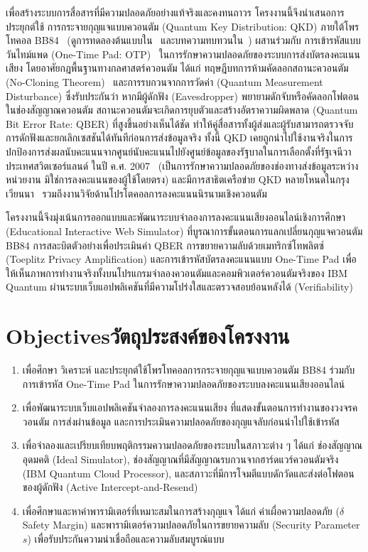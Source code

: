 เพื่อสร้างระบบการสื่อสารที่มีความปลอดภัยอย่างแท้จริงและคงทนถาวร โครงงานนี้จึงนำเสนอการประยุกต์ใช้ การกระจายกุญแจแบบควอนตัม (Quantum Key Distribution: QKD) ภายใต้โพรโทคอล BB84~\cite{bb84} (ดูการทดลองต้นแบบใน~\cite{bennett_1992_experimental} และบทความทบทวนใน~\cite{gisin_qkd_review, pirandola_advances_qkd}) ผสานร่วมกับ การเข้ารหัสแบบวันไทม์แพด (One-Time Pad: OTP)~\cite{vernam_cipher, shannon_secure} ในการรักษาความปลอดภัยของระบบการส่งบัตรลงคะแนนเสียง โดยอาศัยกฎพื้นฐานทางกลศาสตร์ควอนตัม ได้แก่ ทฤษฎีบทการห้ามคัดลอกสถานะควอนตัม (No-Cloning Theorem)~\cite{wootters_zurek_nocloning} และการรบกวนจากการวัดค่า (Quantum Measurement Disturbance) ซึ่งรับประกันว่า หากมีผู้ดักฟัง (Eavesdropper) พยายามดักจับหรือคัดลอกโฟตอนในช่องสัญญาณควอนตัม สถานะควอนตัมจะเกิดการยุบตัวและสร้างอัตราความผิดพลาด (Quantum Bit Error Rate: QBER) ที่สูงขึ้นอย่างเห็นได้ชัด ทำให้คู่สื่อสารทั้งผู้ส่งและผู้รับสามารถตรวจจับการดักฟังและยกเลิกเซสชันได้ทันทีก่อนการส่งข้อมูลจริง ทั้งนี้ QKD เคยถูกนำไปใช้งานจริงในการปกป้องการส่งผลนับคะแนนจากศูนย์นับคะแนนไปยังศูนย์ข้อมูลของรัฐบาลในการเลือกตั้งที่รัฐเจนีวา ประเทศสวิตเซอร์แลนด์ ในปี ค.ศ. 2007~\cite{idquantique_geneva_2007} (เป็นการรักษาความปลอดภัยของช่องทางส่งข้อมูลระหว่างหน่วยงาน มิใช่การลงคะแนนของผู้ใช้โดยตรง) และมีการสาธิตเครือข่าย QKD หลายโหนดในกรุงเวียนนา~\cite{peev_secoqc_2009} รวมถึงงานวิจัยด้านโปรโตคอลการลงคะแนนนิรนามเชิงควอนตัม~\cite{vaccaro_quantum_voting, horoshko_quantum_voting}

โครงงานนี้จึงมุ่งเน้นการออกแบบและพัฒนาระบบจำลองการลงคะแนนเสียงออนไลน์เชิงการศึกษา (Educational Interactive Web Simulator) ที่บูรณาการขั้นตอนการแลกเปลี่ยนกุญแจควอนตัม BB84 การสละบิตตัวอย่างเพื่อประเมินค่า QBER การขยายความลับด้วยเมทริกซ์โทพลิตซ์ (Toeplitz Privacy Amplification) และการเข้ารหัสบัตรลงคะแนนแบบ One-Time Pad เพื่อให้เห็นภาพการทำงานจริงทั้งบนโปรแกรมจำลองควอนตัมและคอมพิวเตอร์ควอนตัมจริงของ IBM Quantum ผ่านระบบเว็บแอปพลิเคชันที่มีความโปร่งใสและตรวจสอบย้อนหลังได้ (Verifiability)~\cite{e2e_voting}

\section{\ifenglish Objectives\else วัตถุประสงค์ของโครงงาน\fi}
\begin{enumerate}
    \item เพื่อศึกษา วิเคราะห์ และประยุกต์ใช้โพรโทคอลการกระจายกุญแจแบบควอนตัม BB84 ร่วมกับการเข้ารหัส One-Time Pad ในการรักษาความปลอดภัยของระบบลงคะแนนเสียงออนไลน์
    \item เพื่อพัฒนาระบบเว็บแอปพลิเคชันจำลองการลงคะแนนเสียง ที่แสดงขั้นตอนการทำงานของวงจรควอนตัม การส่งผ่านข้อมูล และการประเมินความปลอดภัยของกุญแจลับก่อนนำไปใช้เข้ารหัส
    \item เพื่อจำลองและเปรียบเทียบพฤติกรรมความปลอดภัยของระบบในสภาวะต่าง ๆ ได้แก่ ช่องสัญญาณอุดมคติ (Ideal Simulator), ช่องสัญญาณที่มีสัญญาณรบกวนจากฮาร์ดแวร์ควอนตัมจริง (IBM Quantum Cloud Processor), และสภาวะที่มีการโจมตีแบบดักวัดและส่งต่อโฟตอนของผู้ดักฟัง (Active Intercept-and-Resend)
    \item เพื่อศึกษาและหาค่าพารามิเตอร์ที่เหมาะสมในการสร้างกุญแจ ได้แก่ ค่าเผื่อความปลอดภัย ($\delta$ Safety Margin) และพารามิเตอร์ความปลอดภัยในการขยายความลับ (Security Parameter $s$) เพื่อรับประกันความน่าเชื่อถือและความลับสมบูรณ์แบบ
\end{enumerate}

